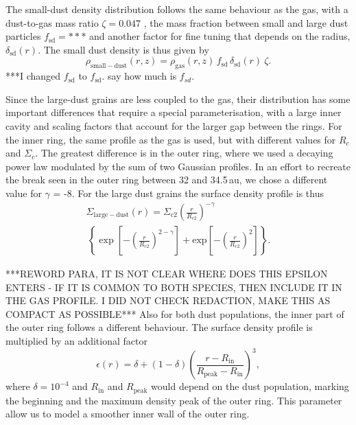 \documentclass[letters,usenatbib,times]{mnras}
\begin{document}
The small-dust density distribution follows the same behaviour as the gas, with a dust-to-gas mass ratio $\zeta = 0.047$ \citep[as in][]{Rosenfeld_2013}, the mass fraction between small and large dust particles $f_\mathrm{sd}=***$ and another factor for fine tuning that depends on the radius,  $\delta_{\mathrm{sd}}(r)$. The small dust density is thus given by 
\begin{equation}
\rho_{\mathrm{small-dust}}(r,z)=\rho_{\mathrm{gas}}(r,z)\, f_{\mathrm{sd}} \, \delta_{\mathrm{sd}}(r) \: \zeta .
\end{equation}
***I changed $f_{\mathrm{sd}}$  to $f_{\mathrm{sd}}$. say how much is $f_{sd}$. 

Since the large-dust grains are less coupled to the gas, their distribution has some important differences that require a special parameterisation, with a large inner cavity and   scaling factors that account for  the larger gap between the rings. For the inner ring, the same profile as the gas is used, but with different values for $R_c$ and $\Sigma_c$. The greatest difference is in the outer ring, where we used a decaying power law modulated by the sum of two    Gaussian profiles. In an effort to recreate the break seen in the outer ring between 32 and 34.5\,au, we chose a different value for $\gamma$ = -8. For the large dust grains the surface density profile is thus
\begin{multline}
  \Sigma_{\mathrm{large-dust}}(r) = \Sigma_{\mathrm{c}2} \left(\frac{r}{R_{\mathrm{c}2}}\right)^{-\gamma}  \\ \, \left\{ \exp\left[-\left(\frac{r}{R_{\mathrm{c}2}}\right)^{2-\gamma}\right] +  \mathrm{exp}\left[-\left(\frac{r}{R_{\mathrm{c}2}}\right)^{2}\right]\right\}.
\end{multline}

***REWORD PARA, IT IS NOT CLEAR WHERE DOES THIS EPSILON ENTERS - IF IT IS COMMON TO BOTH SPECIES, THEN INCLUDE IT IN THE GAS PROFILE. I DID NOT CHECK REDACTION, MAKE THIS AS COMPACT AS POSSIBLE***  Also for both dust populations, the inner part of the outer ring follows a different behaviour. The surface density profile is multiplied by an additional factor
\begin{equation}
    \epsilon(r) = \delta +  (1 - \delta) \left(\frac{ r - R_\mathrm{in}}{R_\mathrm{peak} - R_\mathrm{in}}\right)^3,
\end{equation}
where $\delta=10^{-4}$ and $R_\mathrm{in}$ and $R_\mathrm{peak}$ would depend on the dust population, marking the beginning and the maximum density peak of the outer ring. This parameter allow us to model a smoother inner wall of the outer ring.
\end{document}
